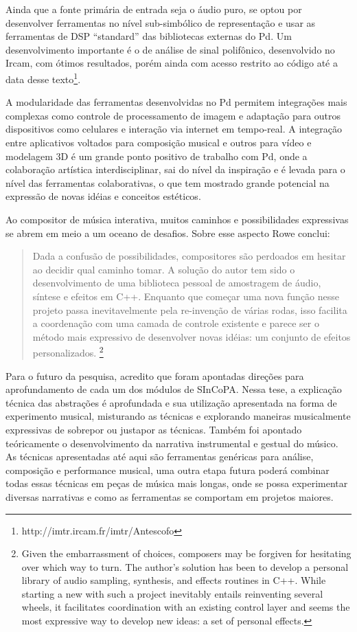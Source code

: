 \documentclass{ppgmus}
\begin{document}
Ainda que a fonte primária de entrada seja o áudio puro, se optou por
desenvolver ferramentas no nível sub-simbólico de representação e usar as ferramentas
de DSP ``standard'' das bibliotecas externas do Pd. Um desenvolvimento importante
é o de análise de sinal polifônico, desenvolvido no Ircam, com ótimos resultados,
porém ainda com acesso restrito
ao código até a data desse texto\footnote{http://imtr.ircam.fr/imtr/Antescofo}.    


A modularidade das ferramentas desenvolvidas no Pd permitem
integrações mais complexas como controle de  processamento de imagem
e adaptação para outros dispositivos como celulares e interação via internet
em tempo-real. A integração entre aplicativos voltados para composição musical
e outros para vídeo e modelagem 3D é um grande ponto positivo de trabalho com
Pd, onde a colaboração artística interdisciplinar, sai do nível da inspiração e é levada para 
o nível das ferramentas colaborativas, o que tem mostrado grande potencial na expressão
de novas idéias e conceitos estéticos.

Ao compositor de música interativa, muitos caminhos e possibilidades
expressivas se abrem em meio a um oceano de desafios. Sobre esse aspecto
Rowe conclui:

\begin{quote}
Dada a confusão de possibilidades, compositores
são perdoados em hesitar ao decidir qual caminho
tomar. A solução do autor tem sido o desenvolvimento
de uma biblioteca pessoal de amostragem de áudio, síntese e
efeitos em C++. Enquanto que começar uma nova função
nesse projeto passa inevitavelmente pela re-invenção
de várias rodas, isso facilita a coordenação com uma
camada de controle existente e parece ser o método 
mais expressivo de desenvolver novas idéias: um
conjunto de efeitos personalizados. \cite{rowe09:levels}
\footnote{Given the embarrassment of choices,
composers may be forgiven for hesitating over
which way to turn. The author's solution has
been to develop a personal library of audio
sampling, synthesis, and effects routines in C++.
While starting a new with such a project
inevitably entails reinventing several wheels, it
facilitates coordination with an existing control
layer and seems the most expressive
way to develop new ideas: a set of personal
effects.} 
\end{quote}


Para o futuro da pesquisa, acredito que foram apontadas direções para aprofundamento
de cada um dos módulos de SInCoPA. Nessa tese, a explicação técnica das abstrações é aprofundada e 
sua utilização apresentada na forma de experimento musical, misturando as técnicas e explorando 
maneiras musicalmente expressivas de
sobrepor ou justapor as técnicas. Também foi apontado teóricamente o 
desenvolvimento da narrativa instrumental e gestual do músico. 
As técnicas apresentadas até aqui são ferramentas genéricas para análise, composição
e performance musical, uma outra etapa futura poderá combinar todas essas técnicas em peças de música mais longas,
onde se possa experimentar diversas narrativas e como as ferramentas se comportam
em projetos maiores.
\end{document}
